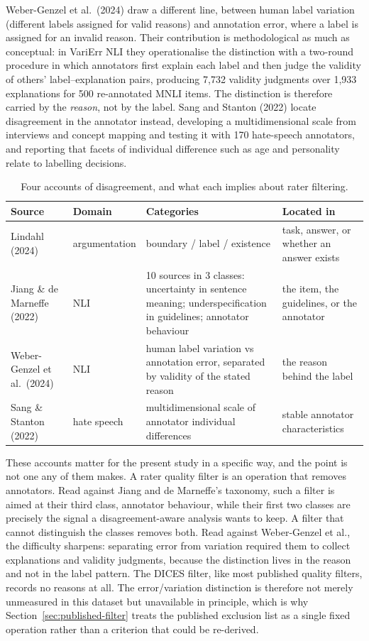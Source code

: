 \documentclass[11pt,a4paper]{article}
\begin{document}
Weber-Genzel et al.\ (2024) draw a different line, between human label variation (different
labels assigned for valid reasons) and annotation error, where a label is assigned for an
invalid reason. Their contribution is methodological as much as conceptual: in VariErr NLI they
operationalise the distinction with a two-round procedure in which annotators first explain each
label and then judge the validity of others' label--explanation pairs, producing 7,732 validity
judgments over 1,933 explanations for 500 re-annotated MNLI items. The distinction is therefore
carried by the \emph{reason}, not by the label. Sang and Stanton (2022) locate disagreement in
the annotator instead, developing a multidimensional scale from interviews and concept mapping
and testing it with 170 hate-speech annotators, and reporting that facets of individual
difference such as age and personality relate to labelling decisions.

\begin{table}[htbp]
\centering
\caption{Four accounts of disagreement, and what each implies about rater filtering.}
\label{tab:taxonomies}
\small
\begin{tabularx}{\textwidth}{p{2.5cm}p{2.2cm}Xp{2.6cm}}
\toprule
\textbf{Source} & \textbf{Domain} & \textbf{Categories} & \textbf{Located in} \\
\midrule
Lindahl (2024) & argumentation & boundary / label / existence & task, answer, or whether an
answer exists \\
Jiang \& de Marneffe (2022) & NLI & 10 sources in 3 classes: uncertainty in sentence meaning;
underspecification in guidelines; annotator behaviour & the item, the guidelines, or the
annotator \\
Weber-Genzel et al.\ (2024) & NLI & human label variation vs annotation error, separated by
validity of the stated reason & the reason behind the label \\
Sang \& Stanton (2022) & hate speech & multidimensional scale of annotator individual
differences & stable annotator characteristics \\
\bottomrule
\end{tabularx}
\end{table}

These accounts matter for the present study in a specific way, and the point is not one any of
them makes. A rater quality filter is an operation that removes annotators. Read against
Jiang and de Marneffe's taxonomy, such a filter is aimed at their third class, annotator
behaviour, while their first two classes are precisely the signal a disagreement-aware
analysis wants to keep. A filter that cannot distinguish the classes removes both. Read against
Weber-Genzel et al., the difficulty sharpens: separating error from variation required them to
collect explanations and validity judgments, because the distinction lives in the reason and not
in the label pattern. The DICES filter, like most published quality filters, records no reasons
at all. The error/variation distinction is therefore not merely unmeasured in this dataset but
unavailable in principle, which is why Section~\ref{sec:published-filter} treats the published
exclusion list as a single fixed operation rather than a criterion that could be re-derived.
\end{document}
